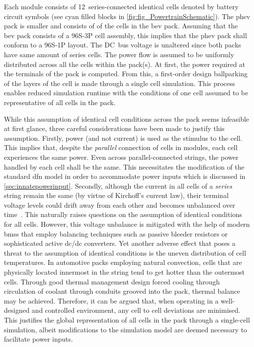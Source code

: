 Each module consists  of 12~series-connected identical cells  denoted by battery
circuit symbols (see cyan  filled blocks in \cref{fig:fig_PowertrainSchematic}).
The \gls{phev}  pack is smaller and  consists of  of  the cells in
the \gls{bev} pack. Assuming that the \gls{bev} pack consists of a \mbox{96S-3P}
cell  assembly,  this implies  that  the  \gls{phev}  pack  shall conform  to  a
\mbox{96S-1P} layout. The DC~bus voltage is unaltered since both packs have same
amount of  series cells. The power  flow is assumed to  be uniformly distributed
across all  the cells within  the pack(s). At first,  the power required  at the
terminals of the  pack is computed. From this, a  first-order design ballparking
of the layers of the cell is made through a single cell simulation. This process
enables reduced simulation runtime with the conditions of one cell assumed to be
representative of all cells in the pack.



While  this  assumption of  identical  cell  conditions  across the  pack  seems
infeasible  at first  glance, three  careful  considerations have  been made  to
justify  this assumption.  Firstly,  power  (and not  current)  is  used as  the
stimulus to the cell. This  implies that, despite the \emph{parallel} connection
of  cells  in  modules,  each  cell experiences  the  same  power.  Even  across
parallel-connected strings,  the power handled by  each cell shall be  the same.
This necessitates the  modification of the standard \gls{dfn} model  in order to
accommodate  power inputs  which  is  discussed in  \cref{sec:innatepowerinput}.
Secondly, although the current in all cells of a \emph{series} string remain the
same (by virtue of Kirchoff's current  law), their terminal voltage levels could
drift away from  each other and becomes  unbalanced over time~\cite{Andrea2010}.
This naturally  raises questions on  the assumption of identical  conditions for
all cells. However, this voltage unbalance  is mitigated with the help of modern
\glspl{bms} that employ  balancing techniques such as  passive bleeder resistors
or  sophisticated active  dc/dc converters.
Yet another  adverse effect that poses  a threat to the  assumption of identical
conditions is the uneven distribution  of cell temperatures. In automotive packs
employing natural convection, cells that are physically located innermost in the
string  tend to  get  hotter  than the  outermost  cells.  Through good  thermal
management design  \eg{} forced cooling  through circulation of  coolant through
conduits  grooved into  the pack,  thermal balance  may be  achieved. Therefore,
it  can  be argued  that,  when  operating  in  a well-designed  and  controlled
environment,  any cell  to cell  deviations  are minimised.  This justifies  the
global representation of all cells in the pack through a single-cell simulation,
albeit modifications to the simulation  model are deemed necessary to facilitate
power inputs.

